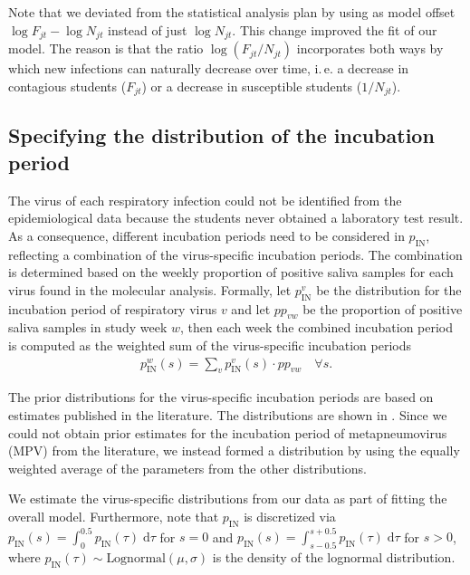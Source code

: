\documentclass[fleqn,11pt]{wlscirep_supp}
\newcommand\ie{i.\,e.\xspace}
\begin{document}
Note that we deviated from the statistical analysis plan by using as model offset $\log F_{jt} - \log N_{jt}$ instead of just $\log N_{jt}$. This change improved the fit of our model. The reason is that the ratio $\log (F_{jt} / N_{jt})$ incorporates both ways by which new infections can naturally decrease over time, \ie a decrease in contagious students ($F_{jt}$) or a decrease in susceptible students ($1 / N_{jt}$).

\subsection{Specifying the distribution of the incubation period}

The virus of each respiratory infection could not be identified from the epidemiological data because the students never obtained a laboratory test result. As a consequence, different incubation periods need to be considered in $p_{\text{IN}}$, reflecting a combination of the virus-specific incubation periods. The combination is determined based on the weekly proportion of positive saliva samples for each virus found in the molecular analysis. Formally, let $p_{\text{IN}}^{v}$ be the distribution for the incubation period of respiratory virus $v$ and let $pp_{vw}$ be the proportion of positive saliva samples in study week $w$, then each week the combined incubation period is computed as the weighted sum of the virus-specific incubation periods
\begin{align}
    p_{\text{IN}}^w(s) = \sum_{v} p_{\text{IN}}^{v}(s) \cdot pp_{vw} \quad \forall s.
\end{align}

The prior distributions for the virus-specific incubation periods are based on estimates published in the literature\cite{McAloon2020,Lessler2009LancetID}. The distributions are shown in . Since we could not obtain prior estimates for the incubation period of metapneumovirus (MPV) from the literature, we instead formed a distribution by using the equally weighted average of the parameters from the other distributions. 

We estimate the virus-specific distributions from our data as part of fitting the overall model. Furthermore, note that $p_\text{IN}$ is discretized via $p_\text{IN}(s) = \int_0^{0.5} p_\text{IN}(\tau) \;\text{d}\tau$ for $s = 0$ and $p_\text{IN}(s) = \int_{s-0.5}^{s+0.5} p_\text{IN}(\tau) \;\text{d}\tau$ for $s > 0$, where $p_\text{IN}(\tau) \sim \textrm{Lognormal}(\mu, \sigma)$ is the density of the lognormal distribution. 
\end{document}

